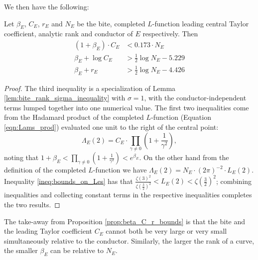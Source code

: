 We then have the following:
\begin{proposition}[GRH]\label{prop:beta_C_r_bounds}
Let $\beta_E$, $C_E$, $r_E$ and $N_E$ be the bite, completed $L$-function leading central Taylor coefficient, analytic rank and conductor of $E$ respectively. Then
\begin{align}
(1+\beta_E)\cdot C_E & < 0.173 \cdot N_E \\
\beta_E + \log C_E &> \frac{1}{2} \log N_E - 5.229  \\
\beta_E + r_E & > \frac{1}{2} \log N_E - 4.426
\end{align}
\end{proposition}
\begin{proof}
The third inequality is a specialization of Lemma \ref{lem:bite_rank_sigma_inequality} with $\sigma=1$, with the conductor-independent terms lumped together into one numerical value. The first two inequalities come from the Hadamard product of the completed $L$-function (Equation \ref{eqn:Lams_prod}) evaluated one unit to the right of the central point:
\begin{equation}
\Lambda_E(2) = C_E\cdot \prod_{\gamma \ne 0} \left(1+\frac{1}{\gamma^2}\right),
\end{equation}
noting that $1+\beta_E < \prod_{\gamma \ne 0} \left(1+\frac{1}{\gamma^2}\right) < e^{\beta_E}$. On the other hand from the definition of the completed $L$-function we have $\Lambda_E(2) = N_E \cdot (2\pi)^{-2}\cdot  L_E(2)$. Inequality \ref{ineq:bounds_on_Les} has that $\frac{\zeta(3)^2}{\zeta(\frac{3}{2})^2} < L_E(2) < \zeta\left(\frac{3}{2}\right)^2$; combining inequalities and collecting constant terms in the respective inequalities completes the two results.
\end{proof}
The take-away from Proposition \ref{prop:beta_C_r_bounds} is that the bite and the leading Taylor coefficient $C_E$ cannot both be very large or very small simultaneously relative to the conductor. Similarly, the larger the rank of a curve, the smaller $\beta_E$ can be relative to $N_E$. \\

